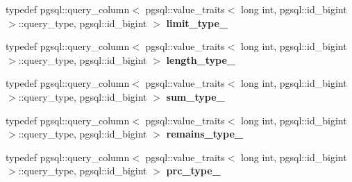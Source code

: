 \begin{DoxyCompactItemize}
\item 
typedef pgsql\+::query\+\_\+column$<$ pgsql\+::value\+\_\+traits$<$ long int, pgsql\+::id\+\_\+bigint $>$\+::query\+\_\+type, pgsql\+::id\+\_\+bigint $>$ {\bfseries limit\+\_\+type\+\_\+}\hypertarget{structodb_1_1pointer__query__columns_3_01_1_1kpk_1_1data_1_1_loan_00_01id__pgsql_00_01_a_01_4_a007bdb42df8fb9c0a50e4130ffcced99}{}\label{structodb_1_1pointer__query__columns_3_01_1_1kpk_1_1data_1_1_loan_00_01id__pgsql_00_01_a_01_4_a007bdb42df8fb9c0a50e4130ffcced99}

\item 
typedef pgsql\+::query\+\_\+column$<$ pgsql\+::value\+\_\+traits$<$ long int, pgsql\+::id\+\_\+bigint $>$\+::query\+\_\+type, pgsql\+::id\+\_\+bigint $>$ {\bfseries length\+\_\+type\+\_\+}\hypertarget{structodb_1_1pointer__query__columns_3_01_1_1kpk_1_1data_1_1_loan_00_01id__pgsql_00_01_a_01_4_a2bf0b0848a6c35b336b57cedce08021f}{}\label{structodb_1_1pointer__query__columns_3_01_1_1kpk_1_1data_1_1_loan_00_01id__pgsql_00_01_a_01_4_a2bf0b0848a6c35b336b57cedce08021f}

\item 
typedef pgsql\+::query\+\_\+column$<$ pgsql\+::value\+\_\+traits$<$ long int, pgsql\+::id\+\_\+bigint $>$\+::query\+\_\+type, pgsql\+::id\+\_\+bigint $>$ {\bfseries sum\+\_\+type\+\_\+}\hypertarget{structodb_1_1pointer__query__columns_3_01_1_1kpk_1_1data_1_1_loan_00_01id__pgsql_00_01_a_01_4_ab3bf3cb9278b5e0fe9381b8282acd570}{}\label{structodb_1_1pointer__query__columns_3_01_1_1kpk_1_1data_1_1_loan_00_01id__pgsql_00_01_a_01_4_ab3bf3cb9278b5e0fe9381b8282acd570}

\item 
typedef pgsql\+::query\+\_\+column$<$ pgsql\+::value\+\_\+traits$<$ long int, pgsql\+::id\+\_\+bigint $>$\+::query\+\_\+type, pgsql\+::id\+\_\+bigint $>$ {\bfseries remains\+\_\+type\+\_\+}\hypertarget{structodb_1_1pointer__query__columns_3_01_1_1kpk_1_1data_1_1_loan_00_01id__pgsql_00_01_a_01_4_ae763e9fe9a428010816cf6cd37e42b75}{}\label{structodb_1_1pointer__query__columns_3_01_1_1kpk_1_1data_1_1_loan_00_01id__pgsql_00_01_a_01_4_ae763e9fe9a428010816cf6cd37e42b75}

\item 
typedef pgsql\+::query\+\_\+column$<$ pgsql\+::value\+\_\+traits$<$ long int, pgsql\+::id\+\_\+bigint $>$\+::query\+\_\+type, pgsql\+::id\+\_\+bigint $>$ {\bfseries prc\+\_\+type\+\_\+}\hypertarget{structodb_1_1pointer__query__columns_3_01_1_1kpk_1_1data_1_1_loan_00_01id__pgsql_00_01_a_01_4_a0950f6a09bd66423be794818350b4a4a}{}\label{structodb_1_1pointer__query__columns_3_01_1_1kpk_1_1data_1_1_loan_00_01id__pgsql_00_01_a_01_4_a0950f6a09bd66423be794818350b4a4a}


\end{DoxyCompactItemize}

